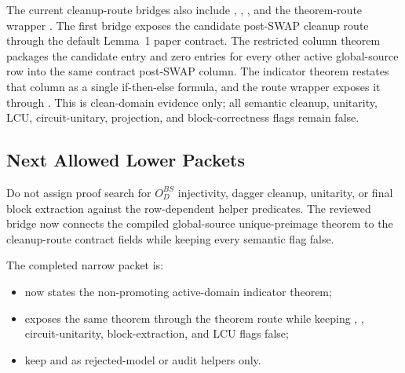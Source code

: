 The current cleanup-route bridges also include
,
,
,
and the theorem-route wrapper
.
The first bridge exposes the candidate post-SWAP cleanup route through the
default Lemma~1 paper contract.  The restricted column theorem packages the
candidate entry  and zero entries for every other active
global-source row into the same contract post-SWAP column.  The indicator
theorem restates that column as a single if-then-else formula, and the route
wrapper exposes it through
.  This is clean-domain evidence
only; all semantic cleanup, unitarity, LCU, circuit-unitary, projection, and
block-correctness flags remain false.

\subsection{Next Allowed Lower Packets}

Do not assign proof search for \(O_D^{BS}\) injectivity, dagger cleanup,
unitarity, or final block extraction against the row-dependent helper
predicates.  The reviewed bridge
now connects the compiled global-source unique-preimage theorem to the
cleanup-route contract fields while keeping every semantic flag false.

The completed narrow packet is:
\begin{itemize}
\item
{}
now states the non-promoting active-domain indicator theorem;
\item
{}
exposes the same theorem through the theorem route while keeping
, , circuit-unitarity,
block-extraction, and LCU flags false;
\item keep  and
 as rejected-model or audit
helpers only.
\end{itemize}

